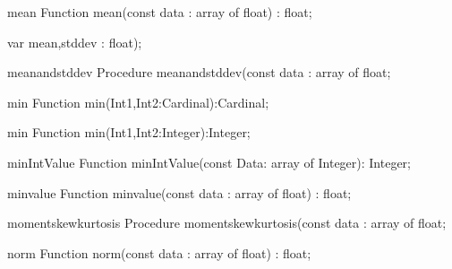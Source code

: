 \FPCexample{}


\begin{function}{mean}
\Declaration
Function mean(const data : array of float) : float;
\Description

\Errors
\SeeAlso
\end{function}

\FPCexample{}


  var mean,stddev : float);
\begin{procedure}{meanandstddev}
\Declaration
Procedure meanandstddev(const data : array of float;
\Description

\Errors
\SeeAlso
\end{procedure}

\FPCexample{}


\begin{function}{min}
\Declaration
Function min(Int1,Int2:Cardinal):Cardinal;
\Description

\Errors
\SeeAlso
\end{function}

\FPCexample{}


\begin{function}{min}
\Declaration
Function min(Int1,Int2:Integer):Integer;
\Description

\Errors
\SeeAlso
\end{function}

\FPCexample{}


\begin{function}{minIntValue}
\Declaration
Function minIntValue(const Data: array of Integer): Integer;
\Description

\Errors
\SeeAlso
\end{function}

\FPCexample{}


\begin{function}{minvalue}
\Declaration
Function minvalue(const data : array of float) : float;
\Description

\Errors
\SeeAlso
\end{function}

\FPCexample{}


\begin{procedure}{momentskewkurtosis}
\Declaration
Procedure momentskewkurtosis(const data : array of float;
\Description

\Errors
\SeeAlso
\end{procedure}

\FPCexample{}


\begin{function}{norm}
\Declaration
Function norm(const data : array of float) : float;
\Description

\Errors
\SeeAlso
\end{function}

